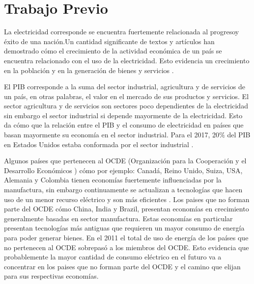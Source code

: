 \documentclass[spanish, letterpaper, 12 pt, conference]{ieeeconf}  %
\begin{document}
\section{Trabajo Previo}

La electricidad corresponde se encuentra fuertemente relacionada al progresoy éxito de una nación.Un cantidad significante de textos y artículos han demostrado cómo el crecimiento  de la actividad económica de un país se encuentra relacionado con el uso de la electricidad. Esto evidencia un crecimiento en la población y en la generación de bienes y servicios \cite{chen_relationship_2007}. 

El PIB  corresponde a la suma del sector  industrial, agricultura y de servicios de un país, en otras palabras, el valor en el mercado de sus productos y servicios. El sector agricultura y de servicios son sectores poco dependientes de la electricidad sin embargo el sector industrial si depende mayormente de la electricidad. Esto da cómo que la relación entre el PIB y el consumo de electricidad en países que basan mayormente su economía en el sector industrial. Para el 2017, 20$\%$ del PIB en Estados Unidos estaba conformada por el sector industrial \cite{noauthor_why_2014}. 

Algunos países que pertenecen al OCDE (Organización para la Cooperación y el Desarrollo Económicos ) cómo por ejemplo: Canadá, Reino Unido, Suiza, USA, Alemania y Colombia tienen economías fuertemente influenciadas por  la manufactura, sin embargo continuamente se actualizan a tecnologías que hacen uso de un menor recurso eléctrico y son más eficientes \cite{noauthor_link_nodate}. Los paises que no forman parte del OCDE cómo China, India y Brazil, presentan economías en crecimiento generalmente basadas en sector manufactura. Estas economías en particular presentan tecnologías más antiguas que requieren un mayor consumo de energía para poder generar bienes. En el 2011 el total de uso de energía de los países que no pertenecen al OCDE sobrepasó a los miembros del OCDE. Esto evidencia que probablemente la mayor cantidad de consumo eléctrico en el futuro va a concentrar en los paises que no forman parte del OCDE y el camino que elijan para sus respectivas economías. 
\end{document}
